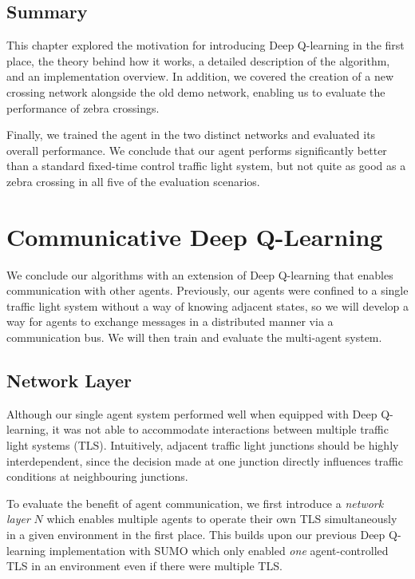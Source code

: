 \documentclass[a4paper]{report}
\begin{document}
\section{Summary}

This chapter explored the motivation for introducing Deep Q-learning in the first place, the theory behind how it works, a detailed description of the algorithm, and an implementation overview. In addition, we covered the creation of a new crossing network alongside the old demo network, enabling us to evaluate the performance of zebra crossings.

Finally, we trained the agent in the two distinct networks and evaluated its overall performance. We conclude that our agent performs significantly better than a standard fixed-time control traffic light system, but not quite as good as a zebra crossing in all five of the evaluation scenarios.

\chapter{Communicative Deep Q-Learning}

We conclude our algorithms with an extension of Deep Q-learning that enables communication with other agents. Previously, our agents were confined to a single traffic light system without a way of knowing adjacent states, so we will develop a way for agents to exchange messages in a distributed manner via a communication bus. We will then train and evaluate the multi-agent system.

\section{Network Layer}

Although our single agent system performed well when equipped with Deep Q-learning, it was not able to accommodate interactions between multiple traffic light systems (TLS). Intuitively, adjacent traffic light junctions should be highly interdependent, since the decision made at one junction directly influences traffic conditions at neighbouring junctions.

To evaluate the benefit of agent communication, we first introduce a \emph{network layer} $N$ which enables multiple agents to operate their own TLS simultaneously in a given environment in the first place. This builds upon our previous Deep Q-learning implementation with SUMO which only enabled \emph{one} agent-controlled TLS in an environment even if there were multiple TLS.
\end{document}
